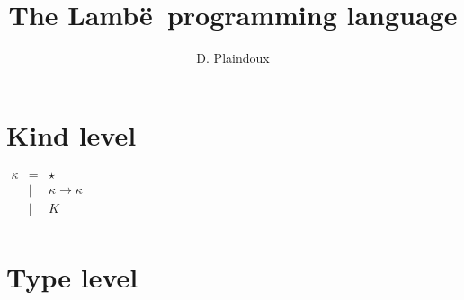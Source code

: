 \documentclass{article}[11pt]
\newcommand{\lambe}[0]{{\sf Lamb\"e~}}
\begin{document}
    \title{The \lambe programming language}
    \author{D. Plaindoux}

    \maketitle


    \section{Kind level}\label{sec:kind-level}

    \begin{math}
        \begin{array}{rcll}
            \kappa
            & =    & \star                     \\
            & \mid & \kappa \rightarrow \kappa \\
            & \mid & K                         \\
        \end{array}
    \end{math}


    \section{Type level}\label{sec:type-level}
\end{document}
